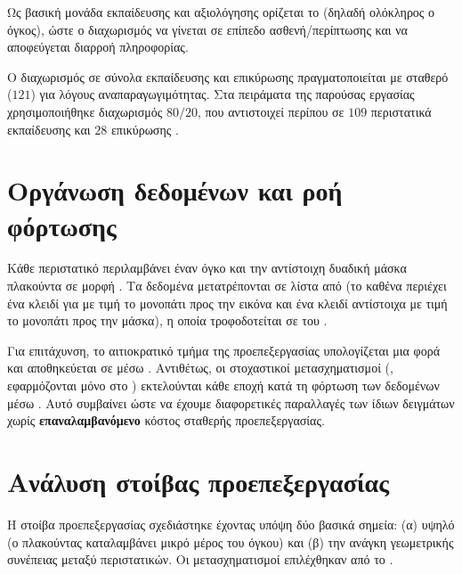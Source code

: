Ως βασική μονάδα εκπαίδευσης και αξιολόγησης ορίζεται το 
(δηλαδή ολόκληρος ο  όγκος), ώστε ο διαχωρισμός να γίνεται σε επίπεδο
ασθενή/περίπτωσης και να αποφεύγεται διαρροή πληροφορίας.

Ο διαχωρισμός σε σύνολα εκπαίδευσης και επικύρωσης πραγματοποιείται με
σταθερό  ($121$) για λόγους αναπαραγωγιμότητας.
Στα πειράματα της παρούσας εργασίας χρησιμοποιήθηκε διαχωρισμός $80/20$,
που αντιστοιχεί περίπου σε $109$ περιστατικά εκπαίδευσης και $28$ επικύρωσης .

\section{Οργάνωση δεδομένων και ροή φόρτωσης}
\label{sec:proto_dataflow}
Κάθε περιστατικό περιλαμβάνει έναν  όγκο και την αντίστοιχη
δυαδική μάσκα πλακούντα σε μορφή . Τα
δεδομένα μετατρέπονται σε λίστα από  (το καθένα περιέχει ένα κλειδί για
 με τιμή το μονοπάτι προς την εικόνα και ένα κλειδί  
αντίστοιχα με τιμή το μονοπάτι προς την μάσκα), η οποία τροφοδοτείται σε
 του .

Για επιτάχυνση, το αιτιοκρατικό τμήμα της προεπεξεργασίας υπολογίζεται μια φορά και αποθηκεύεται σε  μέσω \textbf{}.
Αντιθέτως, οι στοχαστικοί μετασχηματισμοί (, εφαρμόζονται μόνο στο ) εκτελούνται κάθε εποχή κατά τη φόρτωση των δεδομένων μέσω . 
Αυτό συμβαίνει ώστε να έχουμε διαφορετικές παραλλαγές των ίδιων δειγμάτων χωρίς \textbf{επαναλαμβανόμενο} κόστος σταθερής προεπεξεργασίας.

\section{Ανάλυση στοίβας προεπεξεργασίας}
\label{sec:proto_preproc}

Η στοίβα προεπεξεργασίας σχεδιάστηκε έχοντας υπόψη δύο βασικά σημεία: 
(α) υψηλό  
(ο πλακούντας καταλαμβάνει μικρό μέρος του όγκου) και (β) την ανάγκη
γεωμετρικής συνέπειας μεταξύ περιστατικών. Οι μετασχηματισμοί επιλέχθηκαν
από το  \cite{monaitransforms}.

